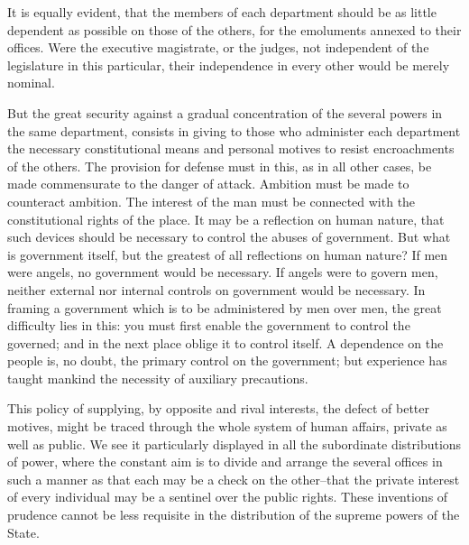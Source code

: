 It is equally evident, that the members of each department should be as little dependent as possible on those of the others, for the emoluments annexed to their offices. Were the executive magistrate, or the judges, not independent of the legislature in this particular, their independence in every other would be merely nominal.

But the great security against a gradual concentration of the several powers in the same department, consists in giving to those who administer each department the necessary constitutional means and personal motives to resist encroachments of the others. The provision for defense must in this, as in all other cases, be made commensurate to the danger of attack. Ambition must be made to counteract ambition. The interest of the man must be connected with the constitutional rights of the place. It may be a reflection on human nature, that such devices should be necessary to control the abuses of government. But what is government itself, but the greatest of all reflections on human nature? If men were angels, no government would be necessary. If angels were to govern men, neither external nor internal controls on government would be necessary. In framing a government which is to be administered by men over men, the great difficulty lies in this: you must first enable the government to control the governed; and in the next place oblige it to control itself. A dependence on the people is, no doubt, the primary control on the government; but experience has taught mankind the necessity of auxiliary precautions.

This policy of supplying, by opposite and rival interests, the defect of better motives, might be traced through the whole system of human affairs, private as well as public. We see it particularly displayed in all the subordinate distributions of power, where the constant aim is to divide and arrange the several offices in such a manner as that each may be a check on the other--that the private interest of every individual may be a sentinel over the public rights. These inventions of prudence cannot be less requisite in the distribution of the supreme powers of the State.

